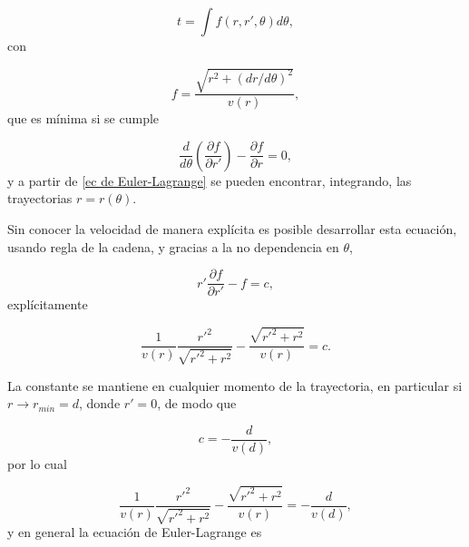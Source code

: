 \documentclass[aps,twocolumn,showpacs,preprintnumbers]{revtex4}
\begin{document}
            \begin{equation*}
                t = \int f(r, r', \theta) d\theta,
            \end{equation*}
            con
            
            \begin{equation}
                f= \frac{\sqrt{r^2 + (dr / d\theta )^2 } }{v(r)}, 
                \label{lagrangiano efectivo}
            \end{equation}
            que es mínima si se cumple
            
            \begin{equation}
               \frac{d}{d \theta } \left( \frac{\partial f}{\partial r'} \right)  - \frac{\partial f}{\partial r} = 0 ,
               \label{ec de Euler-Lagrange}
            \end{equation}
            y a partir de \eqref{ec de Euler-Lagrange} se pueden encontrar, integrando, las trayectorias $r=r(\theta)$. 
            
            Sin conocer la velocidad de manera explícita es posible desarrollar esta ecuación, usando regla de la cadena, y gracias a la no dependencia en $\theta$,
            
            \begin{equation*}
                r' \frac{\partial f}{\partial r'} - f = c ,
            \end{equation*}
            explícitamente
            
            \begin{equation*}
                \frac{1}{v(r)} \frac{{r'}^2}{\sqrt{{r'}^2 + r^2}} - \frac{\sqrt{{r'}^2 + r^2}}{v(r)} = c.
            \end{equation*}
            
            La constante se mantiene en cualquier momento de la trayectoria, en particular si $r \rightarrow r_{min} = d$, donde $r'=0$, de modo que
            
            \begin{equation*}
                c = -\frac{d}{v(d)},
            \end{equation*}
            por lo cual 
            
            \begin{equation*}
                 \frac{1}{v(r)} \frac{{r'}^2}{\sqrt{{r'}^2 + r^2}} - \frac{\sqrt{{r'}^2 + r^2}}{v(r)} =   -\frac{d}{v(d)},
            \end{equation*}
            y en general la ecuación de Euler-Lagrange es
            
\end{document}
